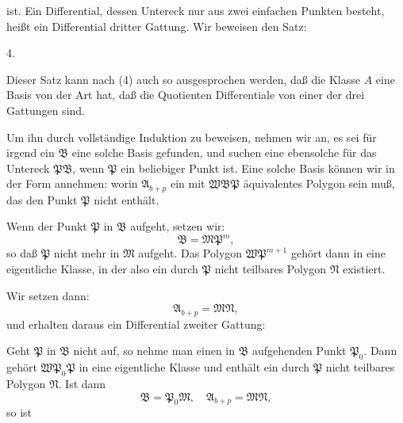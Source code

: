 ist. Ein Differential, dessen Untereck nur aus zwei einfachen Punkten besteht, heißt ein Differential dritter Gattung. Wir beweisen den Satz:

4. 

Dieser Satz kann nach (4) auch so ausgesprochen werden, daß die Klasse $A$ eine Basis
von der Art hat, daß die Quotienten
Differentiale von einer der drei Gattungen sind.

Um ihn durch vollständige Induktion zu beweisen, nehmen wir an, es sei für irgend ein $\mathfrak{B}$ eine solche Basis gefunden, und suchen eine ebensolche für das Untereck $\mathfrak{P}\mathfrak{B}$, wenn $\mathfrak{P}$ ein beliebiger Punkt ist. Eine solche Basis können wir in der Form annehmen:
worin $\mathfrak{A}_{b+p}$ ein mit $\mathfrak{W}\mathfrak{B}\mathfrak{P}$ äquivalentes Polygon sein muß, das den Punkt $\mathfrak{P}$ nicht enthält.

Wenn der Punkt $\mathfrak{P}$ in $\mathfrak{B}$ aufgeht, setzen wir:
\[
\mathfrak{B} = \mathfrak{M}\mathfrak{P}^m,
\]
so daß $\mathfrak{P}$ nicht mehr in $\mathfrak{M}$ aufgeht. Das Polygon $\mathfrak{W}\mathfrak{P}^{m+1}$ gehört dann in eine eigentliche Klasse, in der also ein durch $\mathfrak{P}$ nicht teilbares Polygon $\mathfrak{N}$ existiert.

Wir setzen dann:
\[
\mathfrak{A}_{b+p} = \mathfrak{M}\mathfrak{N},
\]
und erhalten daraus ein Differential zweiter Gattung:

Geht $\mathfrak{P}$ in $\mathfrak{B}$ nicht auf, so nehme man einen in $\mathfrak{B}$ aufgehenden Punkt $\mathfrak{P}_0$. Dann gehört $\mathfrak{W}\mathfrak{P}_0\mathfrak{P}$ in eine eigentliche Klasse und enthält ein durch $\mathfrak{P}$ nicht teilbares Polygon $\mathfrak{N}$. Ist dann
\[
\mathfrak{B} = \mathfrak{P}_0\mathfrak{M}, \quad \mathfrak{A}_{b+p} = \mathfrak{M}\mathfrak{N},
\]
so ist
